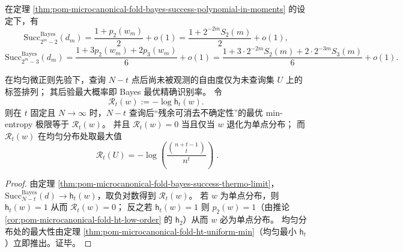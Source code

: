 \begin{corollary}[二、三阶例式]\label{cor:pom-microcanonical-fold-bayes-success-examples-t2-t3}
在定理 \ref{thm:pom-microcanonical-fold-bayes-success-polynomial-in-moments} 的设定下，有
\[
\mathrm{Succ}^{\mathrm{Bayes}}_{2^m-2}(d_m)
=\frac{1+p_2(w_m)}{2}+o(1)
=\frac{1+2^{-2m}S_2(m)}{2}+o(1),
\]
\[
\mathrm{Succ}^{\mathrm{Bayes}}_{2^m-3}(d_m)
=\frac{1+3p_2(w_m)+2p_3(w_m)}{6}+o(1)
=\frac{1+3\cdot 2^{-2m}S_2(m)+2\cdot 2^{-3m}S_3(m)}{6}+o(1).
\]
\end{corollary}

\begin{theorem}\label{thm:pom-microcanonical-fold-residual-min-entropy}
在均匀微正则先验下，查询 \(N-t\) 点后尚未被观测的自由度仅为未查询集 \(U\) 上的标签排列；
其后验最大概率即 Bayes 最优精确识别率。
令
\[
\mathcal{R}_t(w):=-\log \mathsf{h}_t(w).
\]
则在 \(t\) 固定且 \(N\to\infty\) 时，\(N-t\) 查询后“残余可消去不确定性”的最优 min-entropy 极限等于 \(\mathcal{R}_t(w)\)。
并且 \(\mathcal{R}_t(w)=0\) 当且仅当 \(w\) 退化为单点分布；
而 \(\mathcal{R}_t(w)\) 在均匀分布处取最大值
\[
\boxed{\;
\mathcal{R}_t(U)= -\log\!\left(\frac{\binom{n+t-1}{t}}{n^t}\right)\; } .
\]
\end{theorem}
\begin{proof}
由定理 \ref{thm:pom-microcanonical-fold-bayes-success-thermo-limit}，
\(
\mathrm{Succ}^{\mathrm{Bayes}}_{N-t}(d)\to \mathsf{h}_t(w)
\)，取负对数得到 \(\mathcal{R}_t(w)\)。
若 \(w\) 为单点分布，则 \(\mathsf{h}_t(w)=1\) 从而 \(\mathcal{R}_t(w)=0\)；
反之若 \(\mathsf{h}_t(w)=1\) 则 \(p_2(w)=1\)（由推论 \ref{cor:pom-microcanonical-fold-ht-low-order} 的 \(\mathsf{h}_2\)）从而 \(w\) 必为单点分布。
均匀分布处的最大性由定理 \ref{thm:pom-microcanonical-fold-ht-uniform-min}（均匀最小 \(\mathsf{h}_t\)）立即推出。证毕。
\end{proof}

